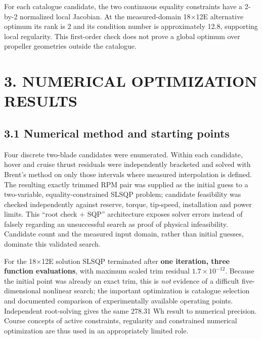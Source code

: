 \documentclass[12pt]{article}
\begin{document}
For each catalogue candidate, the two continuous equality constraints have a 2-by-2 normalized local Jacobian. At the measured-domain 18$\times$12E alternative optimum its rank is 2 and its condition number is approximately 12.8, supporting local regularity. This first-order check does not prove a global optimum over propeller geometries outside the catalogue.

\section*{3. NUMERICAL OPTIMIZATION RESULTS}
\subsection*{3.1 Numerical method and starting points}
Four discrete two-blade candidates were enumerated. Within each candidate, hover and cruise thrust residuals were independently bracketed and solved with Brent's method on only those intervals where measured interpolation is defined. The resulting exactly trimmed RPM pair was supplied as the initial guess to a two-variable, equality-constrained SLSQP problem; candidate feasibility was checked independently against reserve, torque, tip-speed, installation and power limits. This ``root check + SQP'' architecture exposes solver errors instead of falsely regarding an unsuccessful search as proof of physical infeasibility. Candidate count and the measured input domain, rather than initial guesses, dominate this validated search.

For the 18$\times$12E solution SLSQP terminated after \textbf{one iteration, three function evaluations}, with maximum scaled trim residual $1.7\times10^{-12}$. Because the initial point was already an exact trim, this is \emph{not} evidence of a difficult five-dimensional nonlinear search; the important optimization is catalogue selection and documented comparison of experimentally available operating points. Independent root-solving gives the same 278.31 Wh result to numerical precision. Course concepts of active constraints, regularity and constrained numerical optimization are thus used in an appropriately limited role.
\end{document}
